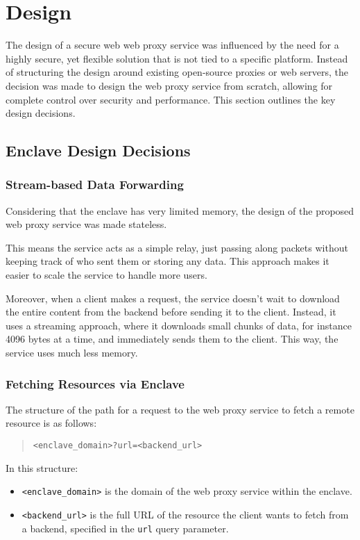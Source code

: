 \chapter{Design}\label{ch:sample-chapter}
The design of a secure web web proxy service was influenced by the need for a highly secure, yet flexible solution that is not tied to a specific platform. Instead of structuring the design around existing open-source proxies or web servers, the decision was made to design the web proxy service from scratch, allowing for complete control over security and performance. This section outlines the key design decisions.

\section{Enclave Design Decisions}
\subsection{Stream-based Data Forwarding} \label{stream-based-design}

Considering that the enclave has very limited memory, the design of the proposed web proxy service was made stateless. 

This means the service acts as a simple relay, just passing along packets without keeping track of who sent them or storing any data. This approach makes it easier to scale the service to handle more users.

Moreover, when a client makes a request, the service doesn’t wait to download the entire content from the backend before sending it to the client. Instead, it uses a streaming approach, where it downloads small chunks of data, for instance 4096 bytes at a time, and immediately sends them to the client. This way, the service uses much less memory.

\subsection{Fetching Resources via Enclave}
The structure of the path for a request to the web proxy service to fetch a remote resource is as follows:

\begin{quote}
\texttt{<enclave\_domain>?url=<backend\_url>}
\end{quote}

In this structure:
\begin{itemize}
    \item \texttt{<enclave\_domain>} is the domain of the web proxy service within the enclave.
    \item \texttt{<backend\_url>} is the full URL of the resource the client wants to fetch from a backend, specified in the \texttt{url} query parameter.
\end{itemize}

